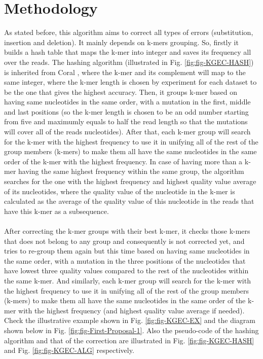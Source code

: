 \documentclass[12pt,openany]{llncs}
\begin{document}
\section{\label{sec:alg1-meth}Methodology}
As stated before, this algorithm aims to correct all types of errors (substitution, insertion and deletion). It mainly depends on k-mers grouping. So, firstly it builds a hash table that maps the k-mer into integer and saves its frequency all over the reads. The hashing algorithm (illustrated in Fig. \ref{fig:fig-KGEC-HASH}) is inherited from Coral \cite{Coral}, where the k-mer and its complement will map to the same integer, where the k-mer length is chosen by experiment for each dataset to be the one that gives the highest accuracy. Then, it groups k-mer based on having same nucleotides in the same order, with a mutation in the first, middle and last positions (so the k-mer length is chosen to be an odd number starting from five and maximumly equals to half the read length so that the mutations will cover all of the reads nucleotides). After that, each k-mer group will search for the k-mer with the highest frequency to use it in unifying all of the rest of the group members (k-mers) to make them all have the same nucleotides in the same order of the k-mer with the highest frequency. In case of having more than a k-mer having the same highest frequency within the same group, the algorithm searches for the one with the highest frequency and highest quality value average of its nucleotides, where the quality value of the nucleotide in the k-mer is calculated as the average of the quality value of this nucleotide in the reads that have this k-mer as a subsequence. 
\\
\\
After correcting the k-mer groups with their best k-mer, it checks those k-mers that does not belong to any group and consequently is not corrected yet, and tries to re-group them again but this time based on having same nucleotides in the same order, with a mutation in the three positions of the nucleotides that have lowest three quality values compared to the rest of the nucleotides within the same k-mer. And similarly, each k-mer group will search for the k-mer with the highest frequency to use it in unifying all of the rest of the group members (k-mers) to make them all have the same nucleotides in the same order of the k-mer with the highest frequency (and highest quality value average if needed). 
\\
Check the illustrative example shown in Fig. \ref{fig:fig-KGEC-EX} and the diagram shown below in Fig. \ref{fig:fig-First-Proposal-1}. Also the pseudo-code of the hashing algorithm and that of the correction are illustrated in Fig. \ref{fig:fig-KGEC-HASH} and Fig. \ref{fig:fig-KGEC-ALG} respectively.
\end{document}
